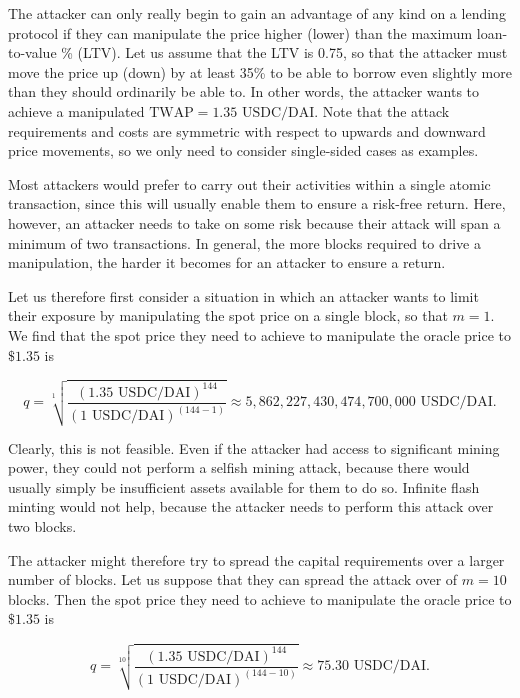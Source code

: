 \documentclass[a4paper, 11pt]{article}
\begin{document}
The attacker can only really begin to gain an advantage of any kind on a lending protocol if they can manipulate the price higher (lower) than the maximum loan-to-value \% (LTV). Let us assume that the LTV is 0.75, so that the attacker must move the price up (down) by at least 35\% to be able to borrow even slightly more than they should ordinarily be able to. In other words, the attacker wants to achieve a manipulated $\text{TWAP} = 1.35 \text{ USDC} / \text{DAI}$. Note that the attack requirements and costs are symmetric with respect to upwards and downward price movements, so we only need to consider single-sided cases as examples. 

Most attackers would prefer to carry out their activities within a single atomic transaction, since this will usually enable them to ensure a risk-free return. Here, however, an attacker needs to take on some risk because their attack will span a minimum of two transactions. In general, the more blocks required to drive a manipulation, the harder it becomes for an attacker to ensure a return. 

Let us therefore first consider a situation in which an attacker wants to limit their exposure by manipulating the spot price on a single block, so that $m = 1$. We find that the spot price they need to achieve to manipulate the oracle price to $\$1.35$ is

\begin{equation}
\label{eq:q-spot-price-1}
q
=
\sqrt[1]{\frac{(1.35 \text{ USDC} / \text{DAI})^{144}}{(1 \text{ USDC} / \text{DAI})^{(144 - 1)}}}
\approx
5,862,227,430,474,700,000 \text{ USDC} / \text{DAI}.
\end{equation}

Clearly, this is not feasible. Even if the attacker had access to significant mining power, they could not perform a selfish mining attack, because there would usually simply be insufficient assets available for them to do so. Infinite flash minting would not help, because the attacker needs to perform this attack over two blocks. 

The attacker might therefore try to spread the capital requirements over a larger number of blocks. Let us suppose that they can spread the attack over of $m = 10$ blocks. Then the spot price they need to achieve to manipulate the oracle price to$\$1.35$ is

\begin{equation}
\label{eq:q-spot-price-2}
q
=
\sqrt[10]{\frac{(1.35 \text{ USDC} / \text{DAI})^{144}}{(1 \text{ USDC} / \text{DAI})^{(144 - 10)}}}
\approx
75.30 \text{ USDC} / \text{DAI}.
\end{equation}
\end{document}
